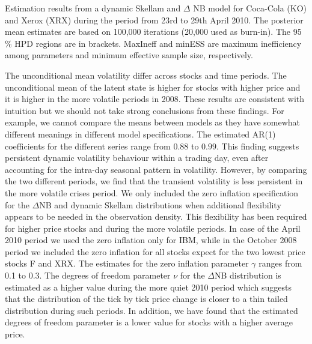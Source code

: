\documentclass[12pt]{article}
\begin{document}
\begin{table}[htbp]
\begin{center}
\caption{\footnotesize Estimation results from a dynamic Skellam and  $\Delta$ NB model for Coca-Cola (KO) and Xerox (XRX)
during the period from 23rd to 29th April 2010.
The posterior mean estimates are based on 100,000 iterations
(20,000 used as burn-in).
The 95 \% HPD regions are in brackets.
MaxIneff and minESS are maximum inefficiency among parameters
and minimum effective sample size, respectively.} 

\label{c_table:emp_res_2010_3}
\end{center}
\end{table}

The unconditional mean volatility differ across stocks and time periods.
The unconditional mean of the latent state is higher for stocks with
higher price and it is higher in the more volatile periods in 2008.
These results are consistent with intuition but we should not take strong
conclusions from these findings.
For example, we cannot compare the means between models as they have
somewhat different meanings in different model specifications.
The estimated AR(1) coefficients for the different series range from $0.88$ to $0.99$.
This finding suggests persistent dynamic volatility behaviour within a trading day, even
after accounting for the intra-day seasonal pattern in volatility.
However, by comparing the two different periods, we find that the
transient volatility is less persistent in
the more volatile crises period.
We only included the zero inflation specification for the $\Delta$NB and dynamic Skellam
distributions when additional flexibility appears to be needed in the observation density.
This flexibility has been required for higher price stocks and during
the more volatile periods.
In case of the April 2010 period we used the zero inflation only for IBM,
while in the October 2008 period we included the zero inflation for all
stocks expect for the two lowest price stocks F and XRX.
The estimates for the zero inflation parameter $\gamma$ ranges from 0.1 to 0.3.
The degrees of freedom parameter $\nu$ for the $\Delta$NB distribution is estimated as
a higher value during the more quiet 2010 period which suggests that the distribution
of the tick by tick price change is closer to a thin tailed distribution
during such periods.
In addition, we have found that the estimated degrees of freedom parameter
is a lower value for stocks with a higher average price.
\end{document}
